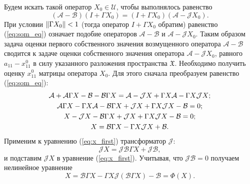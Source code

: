 
Будем искать такой оператор $X_0 \in \mathcal{U}$, чтобы выполнялось равенство
\begin{equation}\label{eq:som_eq}
	(\mathcal{A}-\mathcal{B})(I + \Gamma X_0) = (I + \Gamma X_0)(\mathcal{A}-\mathcal{J}X_0).
\end{equation}
При условии $\left\|\Gamma X_0\right\| < 1$ (тогда оператор $I + \Gamma X_0$ обратим) равенство (\ref{eq:som_eq}) означает подобие операторов $\mathcal{A}-\mathcal{B}$ и $\mathcal{A}-\mathcal{J}X_0$. Таким образом задача оценки первого собственного значения возмущенного оператора $\mathcal{A}-\mathcal{B}$ сводится к задаче оценки собственного значения оператора $\mathcal{A}-\mathcal{J}X_0$, равного $a_{11} - x^{0}_{11}$ в силу указанного разложения пространства $\mathfrak{X}$. Необходимо получить оценку $x^{0}_{11}$ матрицы оператора $X_0$. Для этого сначала преобразуем равенство (\ref{eq:som_eq}):
\begin{gather}
	\mathcal{A} + \mathcal{A} \Gamma X - \mathcal{B} - \mathcal{B} \Gamma X = \mathcal{A} - \mathcal{J} X + \Gamma X \mathcal{A} - \Gamma X \mathcal{J} X; \notag \\
	\mathcal{A} \Gamma X - \Gamma X \mathcal{A} - \mathcal{B} \Gamma X + \mathcal{J} X + \Gamma X \mathcal{J} X - \mathcal{B} = 0; \notag \\
	X - \mathcal{J} X - \mathcal{B} \Gamma X + \mathcal{J} X + \Gamma X \mathcal{J} X - \mathcal{B} = 0;  \notag \\
	X = \mathcal{B} \Gamma X - \Gamma X \mathcal{J} X + \mathcal{B}. \label{eq:x_first}
\end{gather}
Применим к уравнению (\ref{eq:x_first}) трансформатор $\mathcal{J}$:
$$
	\mathcal{J}X = \mathcal{J}\mathcal{B}\Gamma X + \mathcal{J}\mathcal{B},
$$ 
и подставим $\mathcal{J}X$ в уравнение (\ref{eq:x_first}). Учитывая, что $\mathcal{JB} = 0 $ получаем нелинейное уравнение
\begin{equation}\label{eq:x_main}
	X = \mathcal{B}\Gamma X - \Gamma X \mathcal{J}(\mathcal{B}\Gamma X) - \mathcal{B} = \Phi(X).
\end{equation}

